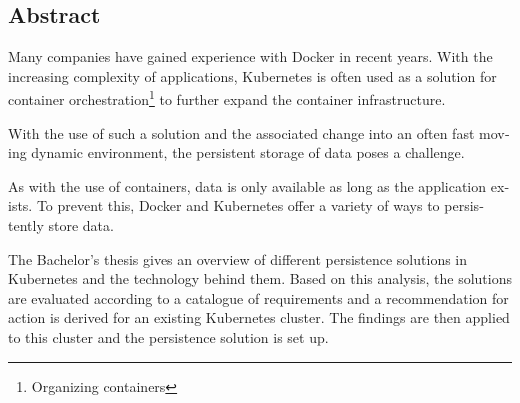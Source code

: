 \begin{otherlanguage}{american}
	\chapter*{Abstract}
Many companies have gained experience with Docker in recent years. With the increasing complexity of applications, Kubernetes is often used as a solution for container orchestration\footnote{\label{foot:orchestrationEN}Organizing containers} to further expand the container infrastructure. \medskip 

With the use of such a solution and the associated change into an often fast moving dynamic environment, the persistent storage of data poses a challenge.  \medskip
    
As with the use of containers, data is only available as long as the application exists. To prevent this, Docker and Kubernetes offer a variety of ways to persistently store data.  \medskip
    
The Bachelor's thesis gives an overview of different persistence solutions in Kubernetes and the technology behind them. Based on this analysis, the solutions are evaluated according to a catalogue of requirements and a recommendation for action is derived for an existing Kubernetes cluster. The findings are then applied to this cluster and the persistence solution is set up.

\end{otherlanguage}